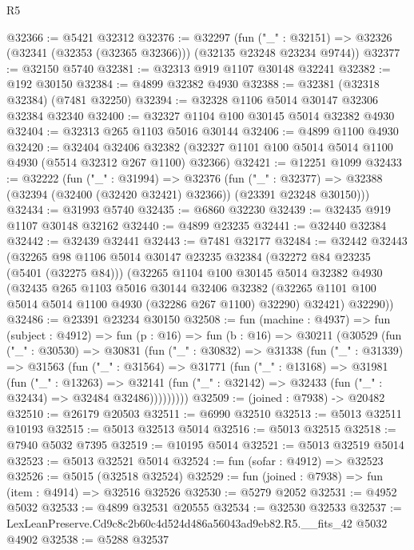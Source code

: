 \begin{lexlean}{R5}
\begin{coremodule}
@32366 := @5421 @32312
@32376 := @32297
    (fun ("_" : @32151) => @32326 (@32341 (@32353 (@32365 @32366))) (@32135 @23248 @23234 @9744))
@32377 := @32150 @5740
@32381 := @32313 @919 @1107 @30148 @32241
@32382 := @192 @30150
@32384 := @4899 @32382 @4930
@32388 := @32381 (@32318 @32384) (@7481 @32250)
@32394 := @32328 @1106 @5014 @30147 @32306 @32384 @32340
@32400 := @32327 @1104 @100 @30145 @5014 @32382 @4930
@32404 := @32313 @265 @1103 @5016 @30144
@32406 := @4899 @1100 @4930
@32420 := @32404
    @32406
    @32382
    (@32327 @1101 @100 @5014 @5014 @1100 @4930 (@5514 @32312 @267 @1100) @32366)
@32421 := @12251 @1099
@32433 := @32222
    (fun ("_" : @31994) =>
    @32376
      (fun ("_" : @32377) =>
      @32388 (@32394 (@32400 (@32420 @32421) @32366)) (@23391 @23248 @30150)))
@32434 := @31993 @5740
@32435 := @6860 @32230
@32439 := @32435 @919 @1107 @30148 @32162
@32440 := @4899 @23235
@32441 := @32440 @32384
@32442 := @32439 @32441
@32443 := @7481 @32177
@32484 := @32442
    @32443
    (@32265
      @98
      @1106
      @5014
      @30147
      @23235
      @32384
      (@32272 @84 @23235 (@5401 (@32275 @84)))
      (@32265
        @1104
        @100
        @30145
        @5014
        @32382
        @4930
        (@32435
          @265
          @1103
          @5016
          @30144
          @32406
          @32382
          (@32265 @1101 @100 @5014 @5014 @1100 @4930 (@32286 @267 @1100) @32290)
          @32421)
        @32290))
@32486 := @23391 @23234 @30150
@32508 := fun (machine : @4937) =>
  fun (subject : @4912) =>
  fun (p : @16) =>
  fun (b : @16) =>
  @30211
    (@30529
      (fun ("_" : @30530) =>
      @30831
        (fun ("_" : @30832) =>
        @31338
          (fun ("_" : @31339) =>
          @31563
            (fun ("_" : @31564) =>
            @31771
              (fun ("_" : @13168) =>
              @31981
                (fun ("_" : @13263) =>
                @32141 (fun ("_" : @32142) => @32433 (fun ("_" : @32434) => @32484 @32486)))))))))
@32509 := (joined : @7938) -> @20482
@32510 := @26179 @20503
@32511 := @6990 @32510
@32513 := @5013 @32511 @10193
@32515 := @5013 @32513 @5014
@32516 := @5013 @32515
@32518 := @7940 @5032 @7395
@32519 := @10195 @5014
@32521 := @5013 @32519 @5014
@32523 := @5013 @32521 @5014
@32524 := fun (sofar : @4912) => @32523
@32526 := @5015 (@32518 @32524)
@32529 := fun (joined : @7938) => fun (item : @4914) => @32516 @32526
@32530 := @5279 @2052
@32531 := @4952 @5032
@32533 := @4899 @32531 @20555
@32534 := @32530 @32533
@32537 := LexLeanPreserve.Cd9c8c2b60c4d524d486a56043ad9eb82.R5.__fits_42 @5032 @4902
@32538 := @5288 @32537

\end{coremodule}
\end{lexlean}
